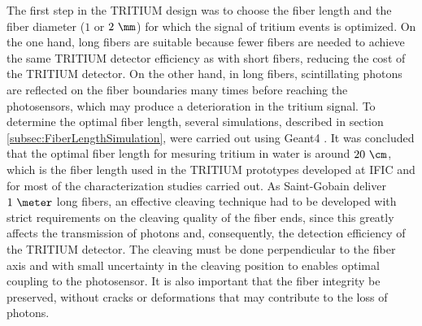 The first step in the TRITIUM design was to choose the fiber length and the fiber diameter ($1$ or $2~\mm$) for which the signal of tritium events is optimized. On the one hand, long fibers are suitable because fewer fibers are needed to achieve the same TRITIUM detector efficiency as with short fibers, reducing the cost of the TRITIUM detector. On the other hand, in long fibers, scintillating photons are reflected on the fiber boundaries many times before reaching the photosensors, which may produce a deterioration in the tritium signal. To determine the optimal fiber length, several simulations, described in section \ref{subsec:FiberLengthSimulation}, were carried out using Geant4 \cite{Geant4WebPage}. It was concluded that the optimal fiber length for mesuring tritium in water is around $20~\cm$, which is the fiber length used in the TRITIUM prototypes developed at IFIC and for most of the characterization studies carried out. As Saint-Gobain deliver $1~\meter$ long fibers, an effective cleaving technique had to be developed with strict requirements on the cleaving quality of the fiber ends, since this greatly affects the transmission of photons and, consequently, the detection efficiency of the TRITIUM detector. The cleaving must be done perpendicular to the fiber axis and with small uncertainty in the cleaving position to enables optimal coupling to the photosensor. It is also important that the fiber integrity be preserved, without cracks or deformations that may contribute to the loss of photons. 

